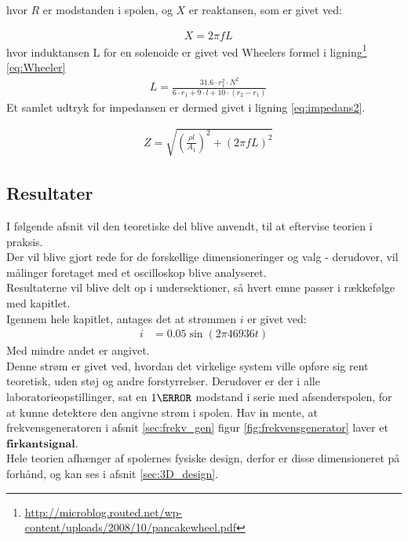 hvor $R$ er modstanden i spolen, og $X$ er reaktansen, som er givet ved:

\begin{align}
	& X=2\pi f L \nonumber
\end{align}
hvor induktansen L for en solenoide er givet ved Wheelers formel i ligning\footnote{\url{http://microblog.routed.net/wp-content/uploads/2008/10/pancakewheel.pdf}} \ref{eq:Wheeler}
\begin{align}
	& L =\frac{31.6\cdot r_1^2\cdot N^2}{6\cdot r_1+9\cdot l + 10\cdot (r_2-r_1)}  \label{eq:Wheeler}
\end{align}
Et samlet udtryk for impedansen er dermed givet i ligning \ref{eq:impedans2}.

\begin{align}
	& Z=\sqrt{\left(\frac{\rho l}{A_1}\right)^2+\left(2\pi f L\right)^2} \label{eq:impedans2}
\end{align}


\subsection{Resultater}
I følgende afsnit vil den teoretiske del blive anvendt, til at eftervise teorien i praksis.\\
Der vil blive gjort rede for de forskellige dimensioneringer og valg - derudover, vil målinger foretaget med et oscilloskop blive analyseret.\\ 
Resultaterne vil blive delt op i undersektioner, så hvert emne passer i rækkefølge med kapitlet.\\
Igennem hele kapitlet, antages det at strømmen $i$ er givet ved:
\begin{align}
	 i&=0.05\sin{(2\pi46936 t)} \nonumber
\end{align}
Med mindre andet er angivet.\\
Denne strøm er givet ved, hvordan det virkelige system ville opføre sig rent teoretisk, uden støj og andre forstyrrelser.
Derudover er der i alle laboratorieopstillinger, sat en $1\ohm$ modstand i serie med afsenderspolen, for at kunne detektere den angivne strøm i spolen.
Hav in mente, at frekvensgeneratoren i afsnit \ref{sec:frekv_gen} figur \ref{fig:frekvensgenerator} laver et $\textbf{firkantsignal}$.\\ 
Hele teorien afhænger af spolernes fysiske design, derfor er disse dimensioneret på forhånd, og kan ses i afsnit \ref{sec:3D_design}.
